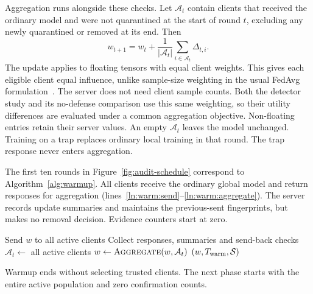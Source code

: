 \documentclass[conference]{IEEEtran}
\makeatletter
\renewcommand{\subsection}{\@startsection{subsection}{2}{\z@}{1.5ex}{0.7ex}{\normalfont\normalsize\itshape}}
\makeatother
\begin{document}
Aggregation runs alongside these checks. Let $\mathcal A_t$ contain clients
that received the ordinary model and were not quarantined at the start of
round $t$, excluding any newly quarantined or removed at its end. Then
\begin{equation}\label{eq:method-aggregation}
 w_{t+1}=w_t+\frac{1}{|\mathcal A_t|}
                 \sum_{i\in\mathcal A_t}\Delta_{t,i}.
\end{equation}
The update applies to floating tensors with equal client weights.
This gives each eligible client equal influence, unlike sample-size
weighting in the usual FedAvg formulation~\cite{mcmahan2017communication}.
The server does not need client sample counts. Both the detector study
and its no-defense comparison use this same weighting, so their utility
differences are evaluated under a common aggregation objective.
Non-floating entries retain their server values. An empty $\mathcal A_t$
leaves the model unchanged. Training on a trap replaces ordinary local
training in that round. The trap response never enters aggregation.

\subsection{Phase I: Warmup}
The first ten rounds in Figure~\ref{fig:audit-schedule} correspond to
Algorithm~\ref{alg:warmup}. All clients receive the ordinary global model
and return responses for aggregation
(lines~\ref{ln:warm:send}--\ref{ln:warm:aggregate}). The server records update
summaries and maintains the previous-sent fingerprints, but makes no
removal decision. Evidence counters start at zero.

\begin{algorithm}[!htb]
\caption{Phase I: ordinary warmup}\label{alg:warmup}
\begin{algorithmic}[1]\small
{}
  \State Send $w$ to all active clients\label{ln:warm:send}
  \State Collect responses, summaries and send-back checks
  \State $\mathcal A_t\gets$ all active clients
  \State $w\gets\Call{Aggregate}{w,\mathcal A_t}$\label{ln:warm:aggregate}
 \EndFor
 \State \Return $(w,T_{\rm warm},\mathcal S)$
\EndProcedure
\end{algorithmic}
\end{algorithm}

Warmup ends without selecting trusted clients. The next phase starts
with the entire active population and zero confirmation counts.
\end{document}
